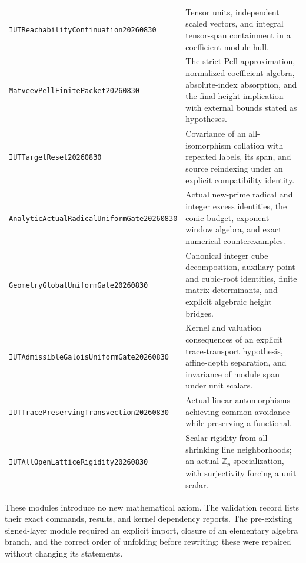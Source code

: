 \documentclass[11pt]{amsart}
\theoremstyle{definition}
\theoremstyle{remark}
\newcommand{\Z}{\mathbb Z}
\begin{document}
\begin{longtable}{>{\raggedright\arraybackslash}p{}>{\raggedright\arraybackslash}p{}}
\texttt{IUTReachability\allowbreak Continuation20260830} & Tensor units,
independent scaled vectors, and integral tensor-span containment in a
coefficient-module hull.\\[3pt]
\texttt{MatveevPellFinitePacket20260830} & The strict Pell approximation,
normalized-coefficient algebra, absolute-index absorption, and the final
height implication with external bounds stated as hypotheses.\\[3pt]
\texttt{IUTTargetReset20260830} & Covariance of an all-isomorphism
collation with repeated labels, its span, and source reindexing under an
explicit compatibility identity.\\[3pt]
\texttt{AnalyticActualRadical\allowbreak UniformGate20260830} & Actual new-prime
radical and integer excess identities, the conic budget, exponent-window
algebra, and exact numerical counterexamples.\\[3pt]
\texttt{GeometryGlobal\allowbreak UniformGate20260830} & Canonical integer cube
decomposition, auxiliary point and cubic-root identities, finite matrix
determinants, and explicit algebraic height bridges.\\[3pt]
\texttt{IUTAdmissibleGalois\allowbreak UniformGate20260830} & Kernel and valuation
consequences of an explicit trace-transport hypothesis, affine-depth
separation, and invariance of module span under unit scalars.\\[3pt]
\texttt{IUTTracePreserving\allowbreak Transvection20260830} & Actual linear
automorphisms achieving common avoidance while preserving a functional.\\[3pt]
\texttt{IUTAllOpenLattice\allowbreak Rigidity20260830} & Scalar rigidity from
all shrinking line neighborhoods; an actual $\Z_p$ specialization, with
surjectivity forcing a unit scalar.\\
\bottomrule
\end{longtable}

These modules introduce no new mathematical axiom. The validation record
lists their exact commands, results, and kernel dependency reports.
The pre-existing signed-layer module required an explicit import, closure
of an elementary algebra branch, and the correct order of unfolding before
rewriting; these were repaired without changing its statements.
\end{document}
